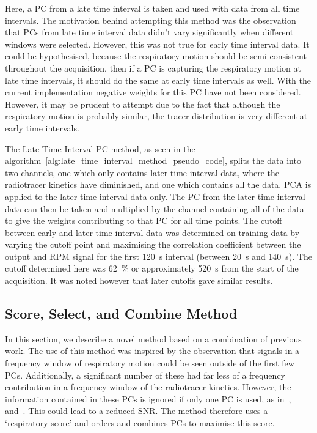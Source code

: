         Here, a \gls{PC} from a late time interval is taken and used with data from all time intervals. The motivation behind attempting this method was the observation that \glspl{PC} from late time interval data didn't vary significantly when different windows were selected. However, this was not true for early time interval data. It could be hypothesised, because the respiratory motion should be semi-consistent throughout the acquisition, then if a \gls{PC} is capturing the respiratory motion at late time intervals, it should do the same at early time intervals as well. With the current implementation negative weights for this \gls{PC} have not been considered. However, it may be prudent to attempt due to the fact that although the respiratory motion is probably similar, the tracer distribution is very different at early time intervals.
            
        The Late Time Interval \gls{PC} method, as seen in the algorithm~\ref{alg:late_time_interval_method_pseudo_code}, splits the data into two channels, one which only contains later time interval data, where the radiotracer kinetics have diminished, and one which contains all the data. \gls{PCA} is applied to the later time interval data only. The \gls{PC} from the later time interval data can then be taken and multiplied by the channel containing all of the data to give the weights contributing to that \gls{PC} for all time points. The cutoff between early and later time interval data was determined on training data by varying the cutoff point and maximising the correlation coefficient between the output and \gls{RPM} signal for the first \SI{120}{\second} interval (between \SI{20}{\second} and \SI{140}{\second}). The cutoff determined here was \SI{62}{\percent} or approximately \SI{520}{\second} from the start of the acquisition. It was noted however that later cutoffs gave similar results.
            
    \subsection{Score, Select, and Combine Method} \label{sec:score_select_and_combine_method}
        In this section, we describe a novel method based on a combination of previous work. The use of this method was inspired by the observation that signals in a frequency window of respiratory motion could be seen outside of the first few \glspl{PC}. Additionally, a significant number of these had far less of a frequency contribution in a frequency window of the radiotracer kinetics. However, the information contained in these \glspl{PC} is ignored if only one \gls{PC} is used, as in~\parencite{Thielemans2011}, and~\parencite{Bertolli2018Data-DrivenTomography}. This could lead to a reduced \gls{SNR}. The method therefore uses a `respiratory score' and orders and combines \glspl{PC} to maximise this score.
            
